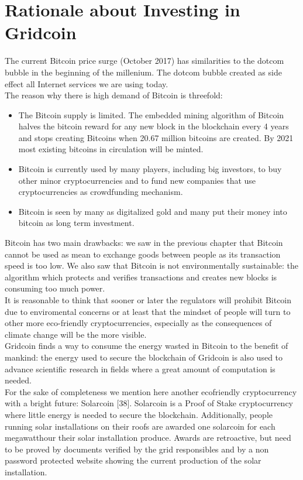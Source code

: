 \section{Rationale about Investing in Gridcoin}

The current Bitcoin price surge (October 2017) has similarities to the dotcom bubble in the beginning of the millenium. The dotcom bubble created as side effect all Internet services we are using today.\\

The reason why there is high demand of Bitcoin is threefold:\\

\begin{itemize}
  	\item The Bitcoin supply is limited. The embedded mining algorithm of Bitcoin halves the bitcoin reward for any new block in the blockchain every 4 years and stops creating Bitcoins when 20.67 million bitcoins are created. By 2021 most existing bitcoins in circulation will be minted.
           \item Bitcoin is currently used by many players, including big investors, to buy other minor cryptocurrencies and to fund new companies that use cryptocurrencies as crowdfunding mechanism.
           \item Bitcoin is seen by many as digitalized gold and many put their money into bitcoin as long term investment.  
\end{itemize}

Bitcoin has two main drawbacks: we saw in the previous chapter that Bitcoin cannot be used as mean to exchange goods between people as its transaction speed is too low. We also saw that Bitcoin is not environmentally sustainable: the algorithm which protects and verifies transactions and creates new blocks is consuming too much power.\\

It is reasonable to think that sooner or later the regulators will prohibit Bitcoin due to enviromental concerns or at least that the mindset of people will turn to other more eco-friendly cryptocurrencies, especially as the consequences of climate change will be the more visible.\\

Gridcoin finds a way to consume the energy wasted in Bitcoin to the benefit of mankind: the energy used to secure the blockchain of Gridcoin is also used to advance scientific research in fields where a great amount of computation is needed.\\

For the sake of completeness we mention here another ecofriendly cryptocurrency with a bright future: Solarcoin [38]. Solarcoin is a Proof of Stake cryptocurrency where little energy is needed to secure the blockchain. Additionally, people running solar installations on their roofs are awarded one solarcoin for each megawatthour their solar installation produce. Awards are retroactive, but need to be proved by documents verified by the grid responsibles and by a non password protected website showing the current production of the solar installation.\\
